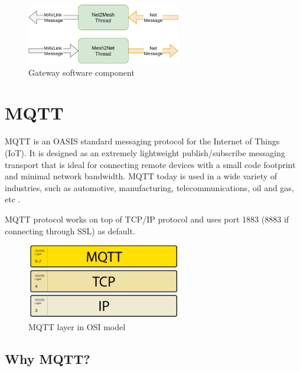 \documentclass[\main/main.tex]{subfiles}
\begin{document}
\begin{figure}[H]
    \begin{center}
        \includegraphics[width=0.6\textwidth]{gateway_software.png}
    \end{center}
    \caption{Gateway software component}
    \label{fig:gateway_software}
\end{figure}

\section{MQTT}
MQTT is an OASIS standard messaging protocol for the Internet of Things (IoT). It is designed as an extremely lightweight publish/subscribe messaging transport that is ideal for connecting remote devices with a small code footprint and minimal network bandwidth. MQTT today is used in a wide variety of industries, such as automotive, manufacturing, telecommunications, oil and gas, etc \cite{web_mqtt_org}.

MQTT protocol works on top of TCP/IP protocol and uses port 1883 (8883 if connecting through SSL) as default.
\begin{figure}[H]
    \begin{center}
        \includegraphics[width=0.6\textwidth]{mqtt_tcp.png}
    \end{center}
    \caption{MQTT layer in OSI model}
    \label{fig:mqtt_tcp}
\end{figure}

\subsection{Why MQTT?}
\end{document}
